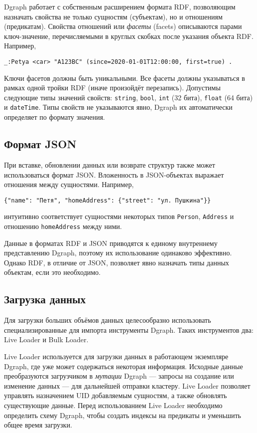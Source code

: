 Dgraph работает с собственным расширением формата RDF, позволяющим назначать свойства не только
сущностям (субъектам), но и отношениям (предикатам). Свойства отношений или \textit{фасеты} (facets) описываются парами
ключ-значение, перечисляемыми в круглых скобках после указания объекта RDF. Например,
\begin{Verbatim}
_:Petya <car> "A123BC" (since=2020-01-01T12:00:00, first=true) .
\end{Verbatim}

Ключи фасетов должны быть уникальными. Все фасеты должны указываться в рамках одной тройки RDF
(иначе произойдёт перезапись). Допустимы следующие типы значений
свойств: \texttt{string}, \texttt{bool}, \texttt{int} (32 бита), \texttt{float} (64 бита) и
\texttt{dateTime}. Типы свойств не указываются явно, Dgraph их автоматически определяет по
формату значения.

\subsection{Формат JSON}

При вставке, обновлении данных или возврате структур также может использоваться формат JSON.
Вложенность в JSON-объектах выражает отношения между сущностями. Например,
\begin{Verbatim}
{"name": "Петя", "homeAddress": {"street": "ул. Пушкина"}}
\end{Verbatim}
интуитивно соответствует сущностями некоторых типов \texttt{Person}, \texttt{Address} и отношению
\texttt{homeAddress} между ними.

Данные в форматах RDF и JSON приводятся к единому внутреннему представлению Dgraph, поэтому их
использование одинаково эффективно. Однако RDF, в отличие от JSON, позволяет явно назначать
типы данных объектам, если это необходимо.

\subsection{Загрузка данных}

Для загрузки больших объёмов данных целесообразно использовать специализированные для импорта
инструменты Dgraph. Таких инструментов два: Live Loader и Bulk Loader.

Live Loader используется для загрузки данных в работающем экземпляре Dgraph, где уже может
содержаться некоторая информация. Исходные данные преобразуются загрузчиком в \textit{мутации}
Dgraph --- запросы на создание или изменение данных --- для дальнейшей отправки кластеру. Live Loader
позволяет управлять назначением UID добавляемым
сущностям, а также обновлять существующие данные. Перед использованием Live Loader необходимо
определить схему Dgraph, чтобы создать индексы на предикаты и уменьшить общее время загрузки.

